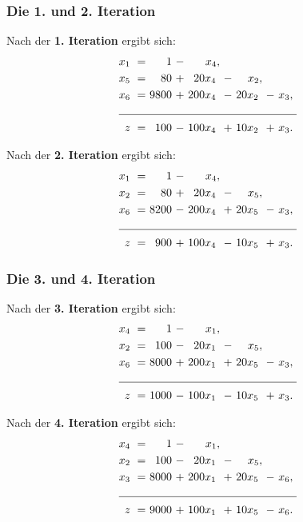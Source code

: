 \documentclass[smaller]{beamer}
\begin{document}
\begin{frame}
 \frametitle{Die 1. und 2. Iteration}
 Nach der \textbf{1. Iteration} ergibt sich:
\begin{align*}
\begin{alignedat}{5}
x_1 &\ = &\     1 &\ - &\    x_4, &\   &\       &\   &\      \\
x_5 &\ = &\    80 &\ + &\  20x_4\ &\ - &\   x_2, &\   &\      \\
x_6 &\ = &\  9800 &\ + &\ 200x_4\ &\ - &\ 20x_2\ &\ - &\ x_3,\ \\ \cline{1-9}
  z &\ = &\   100 &\ - &\ 100x_4\ &\ + &\ 10x_2\ &\ + &\ x_3.\  
\end{alignedat}
\end{align*}

Nach der \textbf{2. Iteration} ergibt sich:
\begin{align*}
\begin{alignedat}{5}
x_1 &\ = &\     1 &\ - &\    x_4, &\   &\       &\   &\      \\
x_2 &\ = &\    80 &\ + &\  20x_4\ &\ - &\   x_5, &\   &\      \\
x_6 &\ = &\  8200 &\ - &\ 200x_4\ &\ + &\ 20x_5\ &\ - &\ x_3,\ \\ \cline{1-9}
  z &\ = &\   900 &\ + &\ 100x_4\ &\ - &\ 10x_5\ &\ + &\ x_3.\  
\end{alignedat}
\end{align*}
\end{frame}

\begin{frame}
 \frametitle{Die 3. und 4. Iteration}
 Nach der \textbf{3. Iteration} ergibt sich:
\begin{align*}
\begin{alignedat}{5}
x_4 &\ = &\     1 &\ - &\    x_1, &\   &\       &\   &\      \\
x_2 &\ = &\   100 &\ - &\  20x_1\ &\ - &\   x_5, &\   &\      \\
x_6 &\ = &\  8000 &\ + &\ 200x_1\ &\ + &\ 20x_5\ &\ - &\ x_3,\ \\ \cline{1-9}
  z &\ = &\  1000 &\ - &\ 100x_1\ &\ - &\ 10x_5\ &\ + &\ x_3.\  
\end{alignedat}
\end{align*}

Nach der \textbf{4. Iteration} ergibt sich:
\begin{align*}
\begin{alignedat}{5}
x_4 &\ = &\     1 &\ - &\    x_1, &\   &\       &\   &\      \\
x_2 &\ = &\   100 &\ - &\  20x_1\ &\ - &\   x_5, &\   &\      \\
x_3 &\ = &\  8000 &\ + &\ 200x_1\ &\ + &\ 20x_5\ &\ - &\ x_6,\ \\ \cline{1-9}
  z &\ = &\  9000 &\ + &\ 100x_1\ &\ + &\ 10x_5\ &\ - &\ x_6.\  
\end{alignedat}
\end{align*}
\end{frame}
\end{document}
